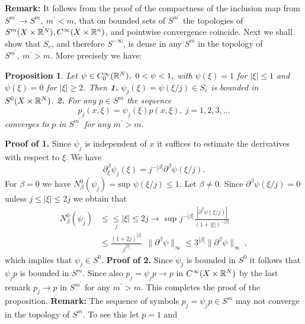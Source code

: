 \documentclass[12pt,reqno]{amsart}
\theoremstyle{plain}  %
\newtheorem{proposition}{Proposition}
\theoremstyle{definition}
\newcommand{\nin}{\noindent}
\begin{document}
\vskip0.2in
\nin
{\bf Remark:}  It follows from the proof of the compactness of the
inclusion map from $ S^{m^\prime} \longrightarrow S^m, \ m^\prime < m$,
that on bounded sets of $ S^{m^\prime} $ the topologies of $ S^m (X \times
\dot {\Bbb R^N}), C^\infty (X \times {\Bbb R^n})$, and pointwise
convergence coincide.
\medskip
\nin
Next we shall show that $ S_c$, and therefore $ S^{- \infty}$, is dense
in any $ S^m$ in the topology of  $ S^{m^\prime}, \ m^\prime > m$.  More
precisely we have:
\medskip
\nin
\begin{proposition}
	\label{prop1}
Let $ \psi \in C^\infty_0 (\Bbb R^N), \ 0 < \psi <
1, $ with $ \psi (\xi) = 1 $ for $ |\xi| \le 1 $ and $ \psi (\xi) = 0 $ for $ |\xi|
\ge 2$.  
Then
\vskip0.1in
\nin
{\bf 1.}  $ \psi_j (\xi) = \psi (\xi/j) \in S_c $ is
bounded in $ S^0 (X \times \Bbb R^{N})$.
\vskip0.2in
\nin
{\bf 2.}  For any $ p \in S^m $ the sequence
$$p_j (x, \xi) = \psi_j (\xi) p(x, \xi), \ j = 1, 2, 3, \dots$$
converges to $ p $ in $ S^{m^\prime} $ for any $ m^\prime > m$.
\end{proposition}
{\bf Proof of 1.}   Since $ \psi_j $ is independent of $ x $ it suffices to
estimate the derivatives with respect to $ \xi$.  We have
$$\partial^\beta_\xi \psi_j (\xi) = j^{- |\beta|} \partial^\beta \psi (\xi/j). $$
For $ \beta = 0 $ we have $ N^0_\beta (\psi_j) = \text{sup } \psi (\xi/j)  \le 1$. 
Let $ \beta \neq 0$. Since $ \partial^\beta \psi (\xi/j)= 0 $ unless $ j
\le |\xi| \le 2j $ we obtain that
\begin{equation*}
	\begin{split}
N^0_\beta (\psi_j) &\le \underset j \le |\xi| \le 2j\to{\text{ sup  }}
j^{- |\beta|} \frac{\left | \partial^\beta \psi (\xi/j) \right |}{(1 + |\xi|)^{-
|\beta|}}\\
 &\le \frac{(1 + 2j)^{|\beta|}}{j^{|\beta|} }\
\ \|\partial^\beta \psi \|_\infty 
\le 3^{|\beta|} \|\partial^\beta \psi\|_\infty  \ ,
\end{split}
\end{equation*}
which implies that $ \psi_j \in S^0$.
\vskip0.2in
\nin
{\bf Proof of 2. }  Since $ \psi_j $ is bounded in $ S^0 $ it follows that $ \psi_j p $
is bounded in $ S^m$.  Since also $ p_j = \psi_j p \longrightarrow p $ in
$ C^\infty (X \times \Bbb R^N) $ by the last remark $ p_j
\longrightarrow p $ in $ S^{m^\prime} $ for any $ m^\prime > m$.  This
completes the proof of the proposition.
\vskip0.2in
\nin
{\bf Remark:  } The sequence of symbols $ p_j = \psi_j p \in S^m $ may
not converge in the topology of $ S^m$.  To see this let $ p = 1 $ and
\end{document}
